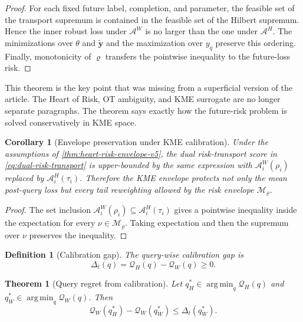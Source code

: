 \documentclass[10pt,journal]{IEEEtran}
\newtheorem{definition}{Definition}
\newtheorem{theorem}{Theorem}
\newtheorem{corollary}{Corollary}
\DeclareMathOperator*{\argmin}{arg\,min}
\newcommand{\Mcal}{\mathcal{M}}
\newcommand{\risk}{\varrho}
\newcommand{\Qcal}{\mathcal{Q}}
\newcommand{\Acal}{\mathcal{A}}
\begin{document}
\begin{proof}
For each fixed future label, completion, and parameter, the feasible set of the transport supremum is contained in the feasible set of the Hilbert supremum. Hence the inner robust loss under $\Acal^W$ is no larger than the one under $\Acal^H$. The minimizations over $\theta$ and $\tilde{\mathbf y}$ and the maximization over $y_q$ preserve this ordering. Finally, monotonicity of $\risk$ transfers the pointwise inequality to the future-loss risk.
\end{proof}

This theorem is the key point that was missing from a superficial version of the article. The Heart of Risk, OT ambiguity, and KME surrogate are no longer separate paragraphs. The theorem says exactly how the future-risk problem is solved conservatively in KME space.


\begin{corollary}[Envelope preservation under KME calibration]
\label{cor:envelope-preservation-v5}
Under the assumptions of \cref{thm:heart-risk-envelope-v5}, the dual risk-transport score in \eqref{eq:dual-risk-transport} is upper-bounded by the same expression with $\Acal_i^W(\rho_i)$ replaced by $\Acal_i^H(\tau_i)$. Therefore the KME envelope protects not only the mean post-query loss but every tail reweighting allowed by the risk envelope $\Mcal_\risk$.
\end{corollary}

\begin{proof}
The set inclusion $\Acal_i^W(\rho_i)\subseteq\Acal_i^H(\tau_i)$ gives a pointwise inequality inside the expectation for every $\nu\in\Mcal_\risk$. Taking expectation and then the supremum over $\nu$ preserves the inequality.
\end{proof}

\begin{definition}[Calibration gap]
\label{def:calibration-gap-v5}
The query-wise calibration gap is
\begin{equation}
    \Delta_t(q)=\Qcal_H(q)-\Qcal_W(q)\ge 0.
\end{equation}
\end{definition}

\begin{theorem}[Query regret from calibration]
\label{thm:calibration-regret-v5}
Let $q_H^*\in\argmin_q\Qcal_H(q)$ and $q_W^*\in\argmin_q\Qcal_W(q)$. Then
\begin{equation}
    \Qcal_W(q_H^*)-\Qcal_W(q_W^*)\le \Delta_t(q_W^*).
\end{equation}
\end{theorem}
\end{document}

